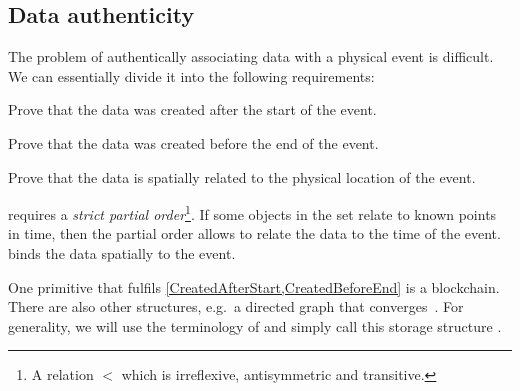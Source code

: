 \subsection{Data authenticity}
\label{DataAuthenticity}

The problem of authentically associating data with a physical event is 
difficult.
We can essentially divide it into the following requirements:
\begin{frame}
\begin{requirements}[A]
  \item\label{CreatedAfterStart} Prove that the data was created after the 
    start of the event.
  \item\label{CreatedBeforeEnd} Prove that the data was created before the end 
    of the event.
  \item\label{SpatiallyRelated} Prove that the data is spatially related to the 
    physical location of the event.
\end{requirements} %

\pause

\end{frame}
 requires a \emph{strict partial 
  order}\footnote{%
  A relation \(<\) which is irreflexive, antisymmetric and transitive.
}.
If some objects in the set relate to known points in time, then the partial 
order allows to relate the data to the time of the event.
 binds the data spatially to the event.

One primitive that fulfils \cref{CreatedAfterStart,CreatedBeforeEnd} is a 
blockchain.
There are also other structures, e.g.\ a directed graph that 
converges~\cite{BlockchainFreeCryptocurrencies}.
For generality, we will use the terminology of 
\textcite{BlockchainFreeCryptocurrencies} and simply call this storage 
structure .

